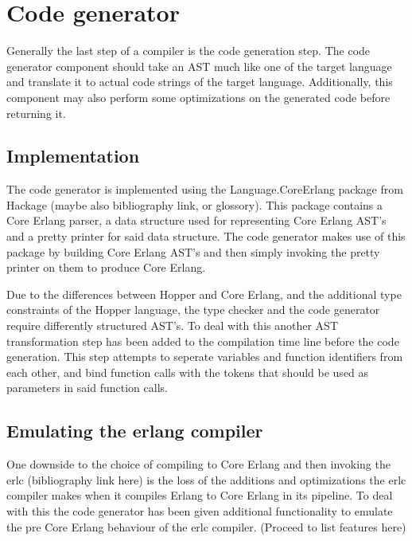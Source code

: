 \section{Code generator}

Generally the last step of a compiler is the code generation step. The code generator
component should take an AST much like one of the target language and translate it
to actual code strings of the target language. Additionally, this component may also
perform some optimizations on the generated code before returning it.

\subsection{Implementation}

The code generator is implemented using the Language.CoreErlang \cite{CoreErlang} package
from Hackage (maybe also bibliography link, or glossory). This package contains a Core Erlang
parser, a data structure used for representing Core Erlang AST's and a pretty printer for
said data structure. The code generator makes use of this package by building Core Erlang
AST's and then simply invoking the pretty printer on them to  produce Core Erlang.

Due to the differences between Hopper and Core Erlang, and the additional type constraints
of the Hopper language, the type checker and the code generator require differently
structured AST's. To deal with this another AST transformation step has been added to the
compilation time line before the code generation. This step attempts to seperate variables
and function identifiers from each other, and bind function calls with the tokens that
should be used as parameters in said function calls.

\subsection{Emulating the erlang compiler}

One downside to the choice of compiling to Core Erlang and then invoking the erlc
(bibliography link here) is the loss of the additions and optimizations the erlc
compiler makes when it compiles Erlang to Core Erlang in its pipeline. To deal with this
the code generator has been given additional functionality to emulate the pre Core Erlang
behaviour of the erlc compiler. (Proceed to list features here)
